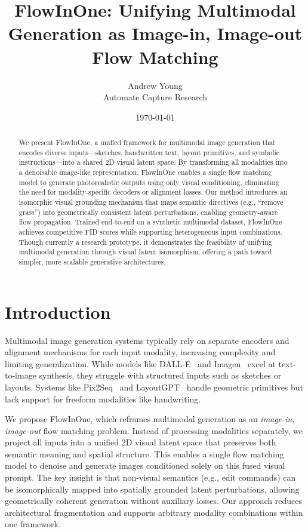 \documentclass[11pt,a4paper]{article}
\title{FlowInOne: Unifying Multimodal Generation as Image-in, Image-out Flow Matching}
\author{Andrew Young \\ Automate Capture Research}
\date{\today}
\begin{document}
\maketitle

\begin{abstract}
We present FlowInOne, a unified framework for multimodal image generation that encodes diverse inputs—sketches, handwritten text, layout primitives, and symbolic instructions—into a shared 2D visual latent space. By transforming all modalities into a denoisable image-like representation, FlowInOne enables a single flow matching model to generate photorealistic outputs using only visual conditioning, eliminating the need for modality-specific decoders or alignment losses. Our method introduces an isomorphic visual grounding mechanism that maps semantic directives (e.g., “remove grass”) into geometrically consistent latent perturbations, enabling geometry-aware flow propagation. Trained end-to-end on a synthetic multimodal dataset, FlowInOne achieves competitive FID scores while supporting heterogeneous input combinations. Though currently a research prototype, it demonstrates the feasibility of unifying multimodal generation through visual latent isomorphism, offering a path toward simpler, more scalable generative architectures.

\end{abstract}

\section{Introduction}
Multimodal image generation systems typically rely on separate encoders and alignment mechanisms for each input modality, increasing complexity and limiting generalization. While models like DALL-E~\cite{ramesh2021zero} and Imagen~\cite{saharia2022photorealistic} excel at text-to-image synthesis, they struggle with structured inputs such as sketches or layouts. Systems like Pix2Seq~\cite{chen2022pix2seq} and LayoutGPT~\cite{li2023layoutgpt} handle geometric primitives but lack support for freeform modalities like handwriting.

We propose FlowInOne, which reframes multimodal generation as an \textit{image-in, image-out} flow matching problem. Instead of processing modalities separately, we project all inputs into a unified 2D visual latent space that preserves both semantic meaning and spatial structure. This enables a single flow matching model to denoise and generate images conditioned solely on this fused visual prompt. The key insight is that non-visual semantics (e.g., edit commands) can be isomorphically mapped into spatially grounded latent perturbations, allowing geometrically coherent generation without auxiliary losses. Our approach reduces architectural fragmentation and supports arbitrary modality combinations within one framework.
\end{document}
